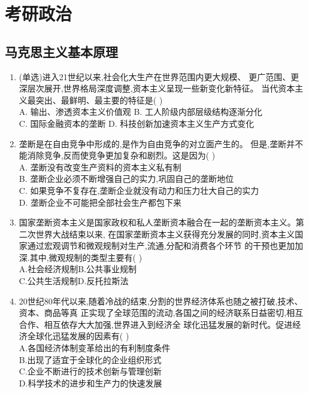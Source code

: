 \documentclass[12pt, a4paper, oneside, UTF8]{ctexbook}
\begin{document}
% 
\else
\fi
\chapter{考研政治}
\section{马克思主义基本原理}
\begin{enumerate}
    \item (单选)进入21世纪以来,社会化大生产在世界范围内更大规模、
    更广范围、更深层次展开,世界格局深度调整,资本主义呈现一些新变化新特征。
    当代资本主义最突出、最鲜明、最主要的特征是(   ) \\
    A. 输出、渗透资本主义价值观 \qquad
    B. 工人阶级内部层级结构逐渐分化 \\
    C. 国际金融资本的垄断 \qquad\qquad\quad
    D. 科技创新加速资本主义生产方式变化

    \item 垄断是在自由竞争中形成的,是作为自由竞争的对立面产生的。
    但是,垄断并不能消除竞争,反而使竞争更加复杂和剧烈。这是因为(   ) \\
    A. 垄断没有改变生产资料的资本主义私有制 \\
    B. 垄断企业必须不断增强自己的实力,巩固自己的垄断地位\\
    C. 如果竞争不复存在,垄断企业就没有动力和压力壮大自己的实力\\
    D. 垄断企业不可能把全部社会生产都包下来

    \item 国家垄断资本主义是国家政权和私人垄断资本融合在一起的垄断资本主义。第二次世界大战结束以来,
    在国家垄断资本主义获得充分发展的同时,资本主义国家通过宏观调节和微观规制对生产,流通,分配和消费各个环节
    的干预也更加加深.其中,微观规制的类型主要有(   ) \\
    A.社会经济规制\qquad B.公共事业规制 \\
    C.公共生活规制\qquad D.反托拉斯法 

    \item 20世纪80年代以来,随着冷战的结束,分割的世界经济体系也随之被打破,技术、资本、商品等真
    正实现了全球范围的流动,各国之间的经济联系日益密切,相互合作、相互依存大大加强,世界进入到经济全
    球化迅猛发展的新时代。促进经济全球化迅猛发展的因素有(   ) \\
    A.各国经济体制变革给出的有利制度条件 \\
    B.出现了适宜于全球化的企业组织形式 \\
    C.企业不断进行的技术创新与管理创新 \\
    D.科学技术的进步和生产力的快速发展


\end{enumerate}
\end{document}
